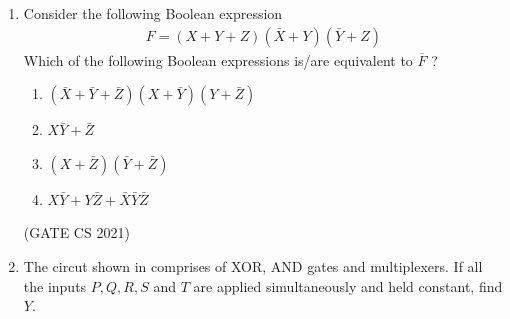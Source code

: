 \begin{enumerate}[label=\arabic*.,ref=\theenumi]
\begin{figure}[H]
	\caption{}
\label{fig:GATE IN 2021}
\end{figure}
%
\item Consider the following Boolean expression 
\begin{align*} F = (X+Y+Z)(\bar{X}+Y)(\bar{Y}+Z) \end{align*}
%       
Which of the following Boolean expressions is/are equivalent to $\overline{F}$ ?
% 
\begin{enumerate}                                     
\item $(\bar{X}+\bar{Y}+\bar{Z})(X+\bar{Y})(Y+\bar{Z})$
\item $X\bar{Y}+\bar{Z}$
\item $(X+\bar{Z})(\bar{Y}+\bar{Z})$
\item $X\bar{Y}+Y\bar{Z}+\bar{X}\bar{Y}\bar{Z}$ 
\end{enumerate}
\hfill{(GATE CS 2021)}
%
    \item The circut shown in  
	    comprises of XOR, AND gates and multiplexers.  
    If all the inputs $P, Q, R, S$ and $T$ are applied simultaneously and held constant, find $Y$.


\end{enumerate}
